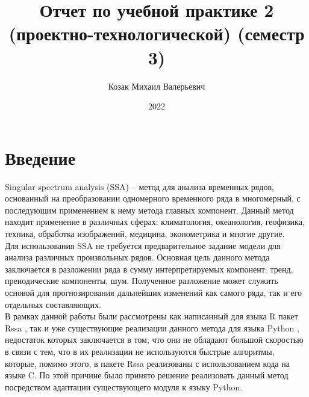 \documentclass[specialist,
			   substylefile = spbu_report.rtx,
			   subf,href,colorlinks=true, 12pt]{disser}
\begin{document}
%
%

\title{Отчет по учебной практике 2 (проектно-технологической) (семестр 3)}


\author{Козак Михаил Валерьевич}


\date{2022}

\maketitle

\tableofcontents

\chapter{Введение}

Singular spectrum analysis (SSA) \cite{ssa-method} – метод для анализа временных рядов, основанный на преобразовании одномерного временного ряда в многомерный, с последующим применением к нему метода главных компонент. Данный метод находит применение в различных сферах: климатология, океанология, геофизика, техника, обработка изображений, медицина, эконометрика и многие другие. \\

Для использования SSA не требуется предварительное задание модели для анализа различных произвольных рядов. Основная цель данного метода заключается в разложении ряда в сумму интерпретируемых компонент: тренд, преиодические компоненты, шум. Полученное разложение может служить основой для  прогнозирования дальнейших изменений как самого ряда, так и его отдельных составляющих.\\

В рамках данной работы были рассмотрены как написанный для языка R пакет Rssa \cite{rssa-book, rssa-doc}, так и уже существующие реализации данного метода для языка Python \cite{pyts-doc, kaggle-ssa-doc, git-kieferc-doc}, недостаток которых заключается в том, что они не обладают большой скоростью в связи с тем, что в их реализации не используются быстрые алгоритмы, которые, помимо этого, в пакете Rssa реализованы с использованием кода на языке C. По этой причине было принято решение реализовать данный метод посредством адаптации существующего модуля к языку Python. \\
\end{document}
